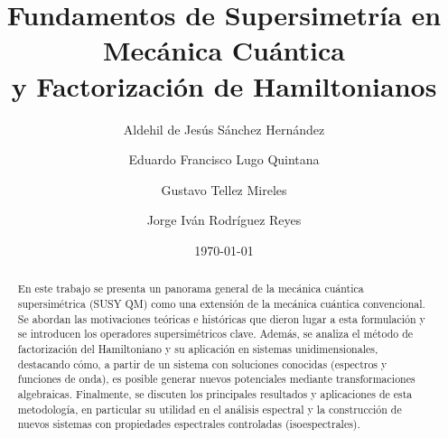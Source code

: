 \documentclass[%
 aip,
 jmp,%
 amsmath,amssymb,
 reprint,
]{revtex4-2}
\begin{document}

\title[Fundamentos de Supersimetría en Mecánica Cuántica y Factorización de Hamiltonianos]{Fundamentos de Supersimetría en Mecánica Cuántica\\ y Factorización de Hamiltonianos}

\author{Aldehil de Jesús Sánchez Hernández}

\author{Eduardo Francisco Lugo Quintana}%

\author{Gustavo Tellez Mireles}

\author{Jorge Iván Rodríguez Reyes}

\date{\today}

\begin{abstract}
En este trabajo se presenta un panorama general de la mecánica cuántica supersimétrica (SUSY QM) como una extensión de la mecánica cuántica convencional. Se abordan las motivaciones teóricas e históricas que dieron lugar a esta formulación y se introducen los operadores supersimétricos clave. Además, se analiza el método de factorización del Hamiltoniano y su aplicación en sistemas unidimensionales, destacando cómo, a partir de un sistema con soluciones conocidas (espectros y funciones de onda), es posible generar nuevos potenciales mediante transformaciones algebraicas. Finalmente, se discuten los principales resultados y aplicaciones de esta metodología, en particular su utilidad en el análisis espectral y la construcción de nuevos sistemas con propiedades espectrales controladas (isoespectrales).
\end{abstract}


\maketitle
\end{document}
